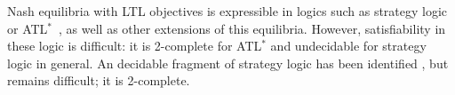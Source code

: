 
Nash equilibria with LTL objectives is expressible in logics such as
strategy logic \cite{Chatterjee&Henzinger&Piterman:2010} or ATL$^\ast$~\cite{Alur&Henzinger&Kupferman:2002}, as well as other extensions of this equilibria.
However, satisfiability in these logic is difficult: it is
2\EXP-complete for ATL$^\ast$ and undecidable for
strategy logic in general.
An decidable fragment of strategy logic has been identified \cite{Mogavero&Murano&Perelli&Vardi:2012},
but remains difficult; it is 2\EXP-complete.
